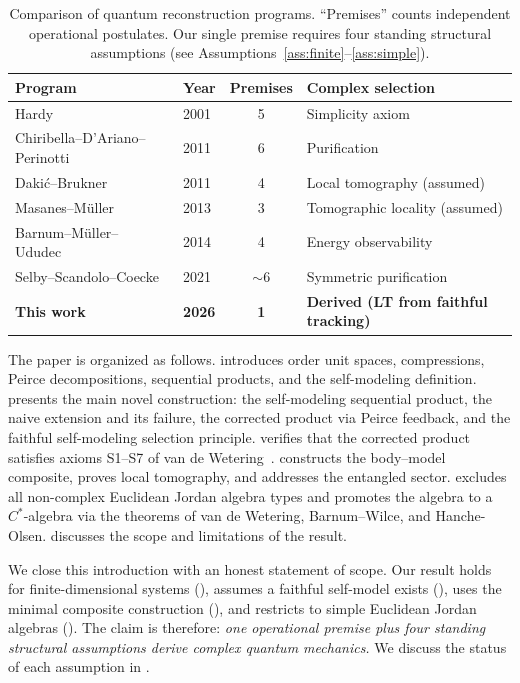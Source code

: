 \documentclass[11pt]{article}
\begin{document}
\begin{table}[ht]
\centering
\caption{Comparison of quantum reconstruction programs.  ``Premises''
counts independent operational postulates.  Our single premise
requires four standing structural assumptions (see
Assumptions~\ref{ass:finite}--\ref{ass:simple}).}
\label{tab:comparison}
\smallskip
\begin{tabular}{@{}llcl@{}}
\toprule
Program & Year & Premises & Complex selection \\
\midrule
Hardy~\cite{Hardy2001} & 2001 & 5 & Simplicity axiom \\
Chiribella--D'Ariano--Perinotti~\cite{CDP2011} & 2011 & 6 & Purification \\
Daki\'c--Brukner~\cite{DakicBrukner2011} & 2011 & 4 & Local tomography (assumed) \\
Masanes--M\"uller~\cite{MasanesMueller2013} & 2013 & 3 & Tomographic locality (assumed) \\
Barnum--M\"uller--Ududec~\cite{BarnumMuellerUdudec2014} & 2014 & 4 & Energy observability \\
Selby--Scandolo--Coecke~\cite{SelbyScandaloCoecke2021} & 2021 & ${\sim}6$ & Symmetric purification \\
\textbf{This work} & \textbf{2026} & \textbf{1} & \textbf{Derived (LT from faithful tracking)} \\
\bottomrule
\end{tabular}
\end{table}



The paper is organized as follows.
 introduces order unit spaces, compressions, Peirce
decompositions, sequential products, and the self-modeling definition.
 presents the main novel construction: the self-modeling
sequential product, the naive extension and its failure, the corrected
product via Peirce feedback, and the faithful self-modeling selection
principle.
 verifies that the corrected product satisfies
axioms S1--S7 of van de Wetering~\cite{vandeWetering2019b}.
 constructs the body--model composite, proves
local tomography, and addresses the entangled sector.
 excludes all non-complex Euclidean Jordan algebra
types and promotes the algebra to a $C^{*}$-algebra via the theorems
of van de Wetering, Barnum--Wilce, and Hanche-Olsen.
 discusses the scope and limitations of the
result.

We close this introduction with an honest statement of scope.  Our
result holds for finite-dimensional systems
(), assumes a faithful self-model exists
(), uses the minimal composite construction
(), and restricts to simple Euclidean Jordan
algebras ().  The claim is therefore: \emph{one
operational premise plus four standing structural assumptions derive
complex quantum mechanics.}  We discuss the status of each assumption
in .
\end{document}
